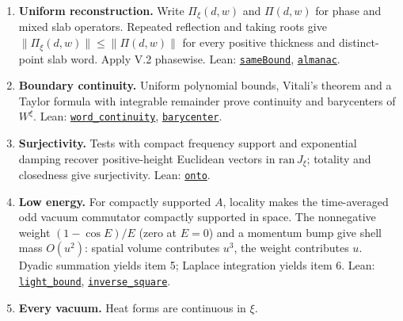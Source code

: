 \documentclass[
  letterpaper,
  11pt]{article}
\providecommand{\tightlist}{%
  \setlength{\itemsep}{0pt}\setlength{\parskip}{0pt}}
\begin{document}
\begin{enumerate}
\def\labelenumi{\arabic{enumi}.}
\tightlist
\item
  \textbf{Uniform reconstruction.} Write \(\Pi_\xi(d,w)\) and
  \(\Pi(d,w)\) for phase and mixed slab operators. Repeated reflection
  and taking roots give \(\|\Pi_\xi(d,w)\|\le\|\Pi(d,w)\|\) for every
  positive thickness and distinct-point slab word. Apply V.2 phasewise.
  Lean:
  \href{https://github.com/yang-mills-group/OpenAI-YM-20261028/blob/3456e5e75cf8d4cd558955a5c7638fba2d68f464/YM/EveryPhase/Pack.lean\#L95-L100}{\texttt{sameBound}},
  \href{https://github.com/yang-mills-group/OpenAI-YM-20261028/blob/3456e5e75cf8d4cd558955a5c7638fba2d68f464/YM/EveryPhase/Pack.lean\#L157-L194}{\texttt{almanac}}.
\item
  \textbf{Boundary continuity.} Uniform polynomial bounds, Vitali's
  theorem and a Taylor formula with integrable remainder prove
  continuity and barycenters of \(W^\xi\). Lean:
  \href{https://github.com/yang-mills-group/OpenAI-YM-20261028/blob/3456e5e75cf8d4cd558955a5c7638fba2d68f464/YM/EveryPhase/Barycenter.lean\#L48-L73}{\texttt{word\_continuity}},
  \href{https://github.com/yang-mills-group/OpenAI-YM-20261028/blob/3456e5e75cf8d4cd558955a5c7638fba2d68f464/YM/EveryPhase/Barycenter.lean\#L75-L90}{\texttt{barycenter}}.
\item
  \textbf{Surjectivity.} Tests with compact frequency support and
  exponential damping recover positive-height Euclidean vectors in
  \(\mathrm{ran}\,J_\xi\); totality and closedness give surjectivity.
  Lean:
  \href{https://github.com/yang-mills-group/OpenAI-YM-20261028/blob/3456e5e75cf8d4cd558955a5c7638fba2d68f464/YM/EveryPhase/Surjective.lean\#L178-L223}{\texttt{onto}}.
\item
  \textbf{Low energy.} For compactly supported \(A\), locality makes the
  time-averaged odd vacuum commutator compactly supported in space. The
  nonnegative weight \((1-\cos E)/E\) (zero at \(E=0\)) and a momentum
  bump give shell mass \(O(u^2)\): spatial volume contributes \(u^3\),
  the weight contributes \(u\). Dyadic summation yields item 5; Laplace
  integration yields item 6. Lean:
  \href{https://github.com/yang-mills-group/OpenAI-YM-20261028/blob/3456e5e75cf8d4cd558955a5c7638fba2d68f464/YM/EveryPhase/Light.lean\#L221-L232}{\texttt{light\_bound}},
  \href{https://github.com/yang-mills-group/OpenAI-YM-20261028/blob/3456e5e75cf8d4cd558955a5c7638fba2d68f464/YM/EveryPhase/Decay.lean\#L173-L192}{\texttt{inverse\_square}}.
\item
  \textbf{Every vacuum.} Heat forms are continuous in \(\xi\).

\end{enumerate}
\end{document}
